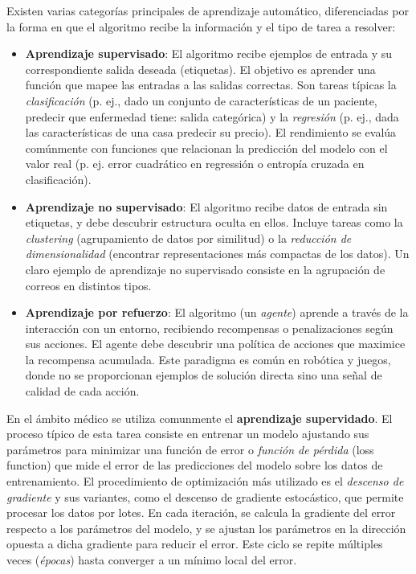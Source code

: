 \documentclass[11pt,spanish,listoffigures,listoftables]{tfgetsinf}
\begin{document}
Existen varias categorías principales de aprendizaje automático, diferenciadas por la forma en que el algoritmo recibe la información 
y el tipo de tarea a resolver:
\begin{itemize}
    \item \textbf{Aprendizaje supervisado}: El algoritmo recibe ejemplos de entrada y su correspondiente salida deseada (etiquetas). 
    El objetivo es aprender una función que mapee las entradas a las salidas correctas. Son tareas típicas la \textit{clasificación} 
    (p. ej., dado un conjunto de características de un paciente, predecir que enfermedad tiene: salida categórica) y la 
    \textit{regresión} (p. ej., dada las características de una casa predecir su precio). El rendimiento se evalúa comúnmente con funciones
    que relacionan la predicción del modelo con el valor real (p. ej. error cuadrático en regressión o entropía cruzada en clasificación).

    \item \textbf{Aprendizaje no supervisado}: El algoritmo recibe datos de entrada sin etiquetas, y debe descubrir estructura oculta en 
    ellos. Incluye tareas como la \textit{clustering} (agrupamiento de datos por similitud) o la \textit{reducción de dimensionalidad} 
    (encontrar representaciones más compactas de los datos). Un claro ejemplo de aprendizaje no supervisado consiste en la agrupación de
    correos en distintos tipos.
    
    \item \textbf{Aprendizaje por refuerzo}: El algoritmo (un \textit{agente}) aprende a través de la interacción con un entorno, 
    recibiendo recompensas o penalizaciones según sus acciones. El agente debe descubrir una política de acciones que maximice la 
    recompensa acumulada. Este paradigma es común en robótica y juegos, donde no se proporcionan ejemplos de solución directa sino una 
    señal de calidad de cada acción.
    
\end{itemize}

En el ámbito médico se utiliza comunmente el \textbf{aprendizaje supervidado}. El proceso típico de esta tarea consiste en entrenar
un modelo ajustando sus parámetros para minimizar una función de error o \textit{función de pérdida} (loss function) que mide el error 
de las predicciones del modelo sobre los datos de entrenamiento. El procedimiento de optimización más utilizado es el 
\textit{descenso de gradiente} y sus variantes, como el descenso de gradiente estocástico, que permite procesar los datos por lotes. 
En cada iteración, se calcula la gradiente del error respecto a los parámetros del modelo, y se ajustan los parámetros en la dirección 
opuesta a dicha gradiente para reducir el error. Este ciclo se repite múltiples veces (\textit{épocas}) 
hasta converger a un mínimo local del error.
\end{document}
